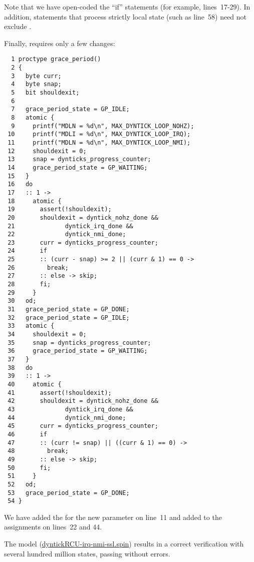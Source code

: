 Note that we have open-coded the ``if'' statements
(for example, lines~17-29).
In addition, statements that process strictly local state
(such as line~58) need not exclude .

Finally,  requires only a few changes:

{ \scriptsize
\begin{verbatim}
  1 proctype grace_period()
  2 {
  3   byte curr;
  4   byte snap;
  5   bit shouldexit;
  6
  7   grace_period_state = GP_IDLE;
  8   atomic {
  9     printf("MDLN = %d\n", MAX_DYNTICK_LOOP_NOHZ);
 10     printf("MDLI = %d\n", MAX_DYNTICK_LOOP_IRQ);
 11     printf("MDLN = %d\n", MAX_DYNTICK_LOOP_NMI);
 12     shouldexit = 0;
 13     snap = dynticks_progress_counter;
 14     grace_period_state = GP_WAITING;
 15   }
 16   do
 17   :: 1 ->
 18     atomic {
 19       assert(!shouldexit);
 20       shouldexit = dyntick_nohz_done &&
 21              dyntick_irq_done &&
 22              dyntick_nmi_done;
 23       curr = dynticks_progress_counter;
 24       if
 25       :: (curr - snap) >= 2 || (curr & 1) == 0 ->
 26         break;
 27       :: else -> skip;
 28       fi;
 29     }
 30   od;
 31   grace_period_state = GP_DONE;
 32   grace_period_state = GP_IDLE;
 33   atomic {
 34     shouldexit = 0;
 35     snap = dynticks_progress_counter;
 36     grace_period_state = GP_WAITING;
 37   }
 38   do
 39   :: 1 ->
 40     atomic {
 41       assert(!shouldexit);
 42       shouldexit = dyntick_nohz_done &&
 43              dyntick_irq_done &&
 44              dyntick_nmi_done;
 45       curr = dynticks_progress_counter;
 46       if
 47       :: (curr != snap) || ((curr & 1) == 0) ->
 48         break;
 49       :: else -> skip;
 50       fi;
 51     }
 52   od;
 53   grace_period_state = GP_DONE;
 54 }
\end{verbatim}
}

We have added the  for the new
 parameter on line~11 and
added  to the 
assignments on lines~22 and 44.

The model (\url{dyntickRCU-irq-nmi-ssl.spin})
results in a correct verification with several hundred million
states, passing without errors.

